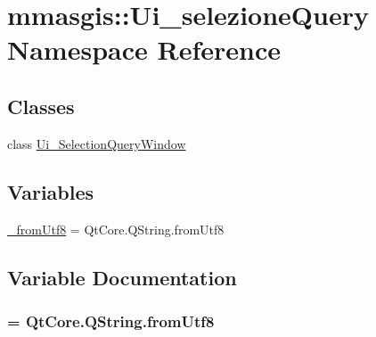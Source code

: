 \hypertarget{namespacemmasgis_1_1Ui__selezioneQuery}{
\section{mmasgis::Ui\_\-selezioneQuery Namespace Reference}
\label{namespacemmasgis_1_1Ui__selezioneQuery}
}
\subsection*{Classes}
\begin{DoxyCompactItemize}
\item 
class \hyperlink{classmmasgis_1_1Ui__selezioneQuery_1_1Ui__SelectionQueryWindow}{Ui\_\-SelectionQueryWindow}
\end{DoxyCompactItemize}
\subsection*{Variables}
\begin{DoxyCompactItemize}
\item 
\hyperlink{namespacemmasgis_1_1Ui__selezioneQuery_a18fd18a9aba2e980d61c871a1d584fc3}{\_\-fromUtf8} = QtCore.QString.fromUtf8
\end{DoxyCompactItemize}


\subsection{Variable Documentation}
\hypertarget{namespacemmasgis_1_1Ui__selezioneQuery_a18fd18a9aba2e980d61c871a1d584fc3}{
\subsubsection[{\_\-fromUtf8}]{ = QtCore.QString.fromUtf8}}
\label{namespacemmasgis_1_1Ui__selezioneQuery_a18fd18a9aba2e980d61c871a1d584fc3}
